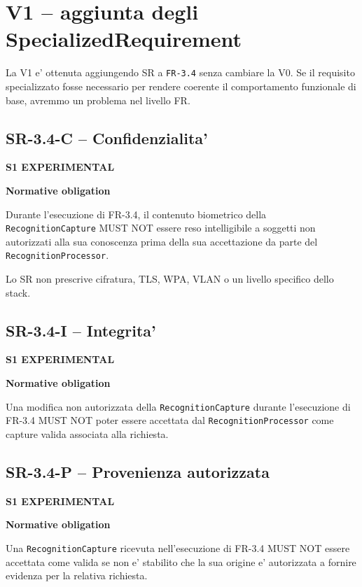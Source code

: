 \documentclass[11pt,a4paper]{article}
\newcommand{\experimental}{\textbf{S1 EXPERIMENTAL}}
\newenvironment{statusbox}[1]{%
  \def\FrameCommand{\fcolorbox{ddtablue}{ddtagray}}%
  \MakeFramed{\advance\hsize-2\width\FrameRestore}
  \noindent\textbf{#1}\par\smallskip
}{\endMakeFramed}
\begin{document}
\section{V1 -- aggiunta degli SpecializedRequirement}

La V1 e' ottenuta aggiungendo SR a \texttt{FR-3.4} senza cambiare la V0. Se il requisito specializzato fosse necessario per rendere coerente il comportamento funzionale di base, avremmo un problema nel livello FR.

\subsection{SR-3.4-C -- Confidenzialita'}

\experimental{}

\begin{statusbox}{Normative obligation}
Durante l'esecuzione di FR-3.4, il contenuto biometrico della \texttt{RecognitionCapture} MUST NOT essere reso intelligibile a soggetti non autorizzati alla sua conoscenza prima della sua accettazione da parte del \texttt{RecognitionProcessor}.
\end{statusbox}

Lo SR non prescrive cifratura, TLS, WPA, VLAN o un livello specifico dello stack.

\subsection{SR-3.4-I -- Integrita'}

\experimental{}

\begin{statusbox}{Normative obligation}
Una modifica non autorizzata della \texttt{RecognitionCapture} durante l'esecuzione di FR-3.4 MUST NOT poter essere accettata dal \texttt{RecognitionProcessor} come capture valida associata alla richiesta.
\end{statusbox}

\subsection{SR-3.4-P -- Provenienza autorizzata}

\experimental{}

\begin{statusbox}{Normative obligation}
Una \texttt{RecognitionCapture} ricevuta nell'esecuzione di FR-3.4 MUST NOT essere accettata come valida se non e' stabilito che la sua origine e' autorizzata a fornire evidenza per la relativa richiesta.
\end{statusbox}
\end{document}
